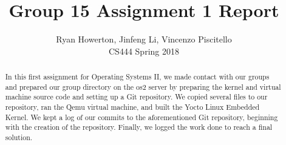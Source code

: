 \documentclass[10pt,draftclsnofoot,onecolumn]{IEEEtran}
\title{Group 15 Assignment 1 Report \vspace{\baselineskip}}
\author{Ryan Howerton, Jinfeng Li, Vincenzo Piscitello \\
		CS444 Spring 2018 \vspace{10\baselineskip}}
\begin{document}
  \maketitle
  \begin{abstract}
  	In this first assignment for Operating Systems II, we made contact with our groups and 
    prepared our group directory on the os2 server by preparing the kernel and virtual machine 
    source code and setting up a Git repository. We copied several files to our repository, ran 
    the Qemu virtual machine, and built the Yocto Linux Embedded Kernel. We kept a log of our 
    commits to the aforementioned Git repository, beginning with the creation of the repository. 
    Finally, we logged the work done to reach a final solution.
  \end{abstract}
  \newpage
\end{document}
